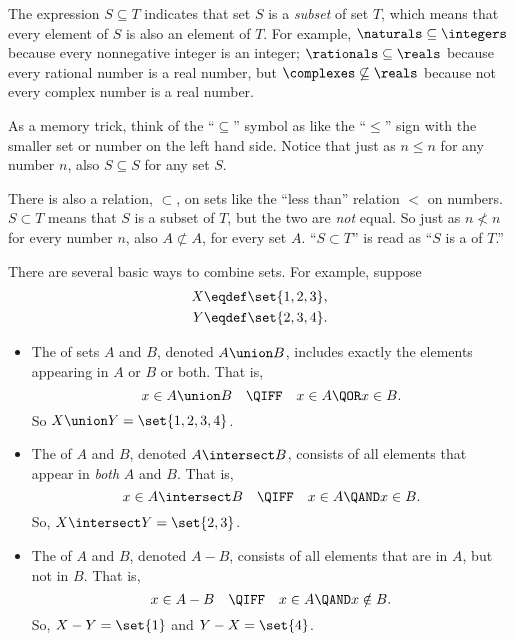 The expression $S \subseteq T$ indicates that set $S$ is a
\emph{subset} of set $T$, which means that
every element of $S$ is also an element of $T$.  For example,
$\naturals \subseteq \integers$ because every nonnegative integer is
an integer; $\rationals \subseteq \reals$ because every rational
number is a real number, but $\complexes \not\subseteq \reals$ because
not every complex number is a real number.

As a memory trick, think of the ``$\subseteq$'' symbol as like the ``$\leq$''
sign with the smaller set or number on the left hand side.  Notice
that just as $n \leq n$ for any number $n$, also $S \subseteq S$ for
any set $S$.

There is also a relation, $\subset$, on sets like the ``less than''
relation $<$ on numbers.  $S \subset T$ means that $S$ is a subset of
$T$, but the two are \emph{not} equal.  So just as $n \not< n$ for
every number $n$, also $A \not\subset A$, for every set $A$.  ``$S
\subset T$'' is read as ``$S$ is a  of $T$.''

There are several basic ways to combine sets.  For example, suppose
\begin{align*}
X & \eqdef \set{1, 2, 3}, \\
Y & \eqdef \set{2, 3, 4}.
\end{align*}

\begin{definition}
\mbox{}

\begin{itemize}
\item The  of sets $A$ and $B$, denoted $A \union B$,
  includes exactly the elements appearing in $A$ or $B$ or both.  That is,
\[
x \in A \union B\quad \QIFF\quad x \in A \QOR x \in B.
\]
So $X \union Y = \set{1, 2, 3, 4}$.

\item The  of $A$ and $B$, denoted $A \intersect
  B$, consists of all elements that appear in \textit{both} $A$ and
  $B$.  That is,
\[
x \in A \intersect B\quad \QIFF\quad x \in A \QAND x \in B.
\]
So, $X \intersect Y = \set{2, 3}$.

\item The  of $A$ and $B$, denoted $A-B$,
  consists of all elements that are in $A$, but not in $B$.  That is,
\[
x \in A - B\quad \QIFF\quad  x \in A \QAND x \notin B.
\]
So, $X -  Y = \set{1}$ and $Y - X = \set{4}$.

\end{itemize}
\end{definition}

